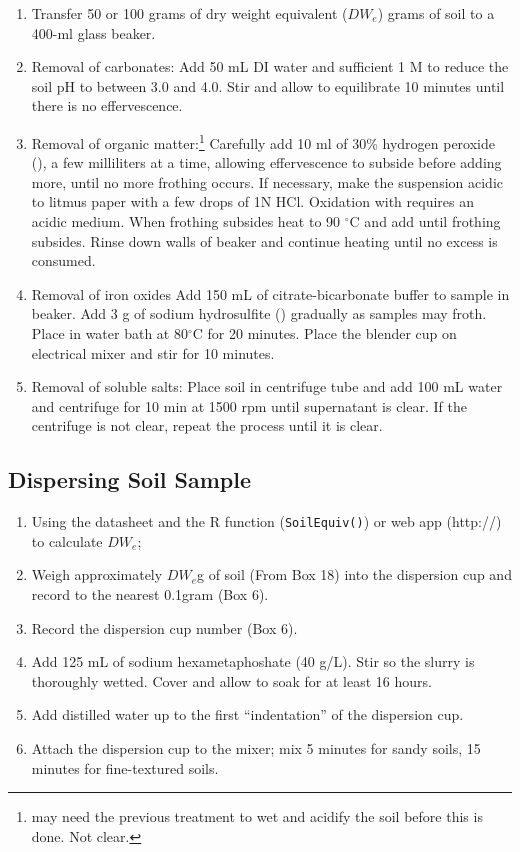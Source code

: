 \documentclass[12pt]{../SOP3_alpha}
\begin{document}
\begin{enumerate}
	\item Transfer 50 or 100 grams of dry weight equivalent ($DW_e$) grams of soil to a 400-ml glass beaker.
	
	\item Removal of carbonates: Add 50 mL DI water and sufficient 1 M  to reduce the soil pH to between 3.0 and 4.0. Stir and allow to equilibrate 10 minutes until there is no effervescence.

	\item Removal of organic matter:\footnote{may need the previous treatment to wet and acidify the soil before this is done. Not clear.} Carefully add 10 ml of 30\% hydrogen peroxide (), a few milliliters at a time, allowing effervescence to subside before adding more, until no more frothing occurs. If necessary, make the suspension acidic to litmus paper with a few drops of 1N HCl.  Oxidation with  requires an acidic medium. When frothing subsides heat to 90 $^\circ$C and add  until frothing subsides. Rinse down walls of beaker and continue heating until no excess  is consumed.

	\item Removal of iron oxides 
	Add 150 mL of citrate-bicarbonate buffer to sample in beaker. Add 3 g of sodium hydrosulfite () gradually as samples may froth.  Place in water bath at 80$^\circ$C for 20 minutes.  Place the blender cup on electrical mixer and stir for 10 minutes.

	\item Removal of soluble salts: Place soil in centrifuge tube and add 100 mL water and centrifuge for 10 min at 1500 rpm until supernatant is clear.  If the centrifuge is not clear, repeat the process until it is clear.

\end{enumerate}
 
\subsection*{Dispersing Soil Sample}

\begin{enumerate}
	\item Using the datasheet and the R function (\texttt{SoilEquiv()}) or web app (http://) to calculate $DW_e$;
	\item Weigh approximately $DW_e$g of soil (From Box 18) into the dispersion cup and record to the nearest 0.1gram (Box 6). 
	\item Record the dispersion cup number (Box 6).
	\item Add 125 mL of sodium hexametaphoshate (40 g/L). Stir so the slurry is thoroughly wetted. Cover and allow to soak for at least 16 hours. 
	\item Add distilled water up to the first ``indentation'' of the dispersion cup.
	\item Attach the dispersion cup to the mixer; mix 5 minutes for sandy soils, 15 minutes for fine-textured soils.
	
\end{enumerate}
\end{document}
